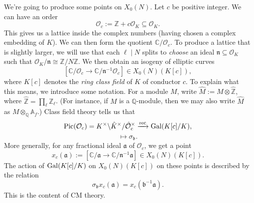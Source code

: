 \documentclass[reqno]{amsart} 
\numberwithin{theorem}{section}
\numberwithin{equation}{section}
\numberwithin{exercise}{section}
\begin{document}
We're going to produce some points on $X_0(N)$.  Let $c$ be positive integer.  We can have an order
\begin{equation*}
  \mathcal{O}_c := \mathbb{Z} + c \mathcal{O}_K \subseteq \mathcal{O}_K.
\end{equation*}
This gives us a lattice inside the complex numbers (having chosen a complex embedding of $K$).  We can then form the quotient $\mathbb{C} / \mathcal{O}_c$.  To produce a lattice that is slightly larger, we will use that each $\ell \mid N$ splits to \emph{choose} an ideal $\mathfrak{n} \subseteq \mathcal{O}_K$ such that $\mathcal{O}_K / \mathfrak{n} \cong \mathbb{Z} / N \mathbb{Z}$.  We then obtain an isogeny of elliptic curves
\begin{equation*}
  \left[ \mathbb{C} / \mathcal{O}_c \rightarrow \mathbb{C} / \mathfrak{n}^{-1} \mathcal{O}_c \right] \in X_0(N)(K[c]),
\end{equation*}
where $K[c]$ denotes the \emph{ring class field} of $K$ of conductor $c$.  To explain what this means, we introduce some notation.  For a module $M$, write $\hat{M} := M \otimes \hat{\mathbb{Z}}$, where $\hat{\mathbb{Z}} = \prod_{\ell} \mathbb{Z}_{\ell}$.  (For instance, if $M$ is a $\mathbb{Q}$-module, then we may also write $\hat{M}$ as $M \otimes_{\mathbb{Q}} \mathbb{A}_f$.)  Class field theory tells us that
\begin{equation*}
  \operatorname{Pic}(\mathcal{O}_c) = K^\times \backslash \hat{K}^\times / \hat{\mathcal{O}}_c^\times \xrightarrow{\mathrm{rec}} \operatorname{Gal}(K[c] / K),
\end{equation*}
\begin{equation*}
  [\mathfrak{b}] \mapsto \sigma_{\mathfrak{b}}.
\end{equation*}
More generally, for any fractional ideal $\mathfrak{a}$ of $\mathcal{O}_c$, we get a point
\begin{equation*}
  x_{c}(\mathfrak{a}) := \left[ \mathbb{C} / \mathfrak{a} \rightarrow \mathbb{C} / \mathfrak{n}^{-1} \mathfrak{a} \right] \in X_0(N)(K[c]).
\end{equation*}
The action of $\operatorname{Gal}(K[c] / K)$ on $X_0(N)(K[c])$ on these points is described by the relation
\begin{equation}\label{eq:cq6sjz7g2n}
  \sigma_{\mathfrak{b}} x_c(\mathfrak{a}) = x_c(\mathfrak{b}^{-1} \mathfrak{a}).
\end{equation}
This is the content of CM theory.
\end{document}
